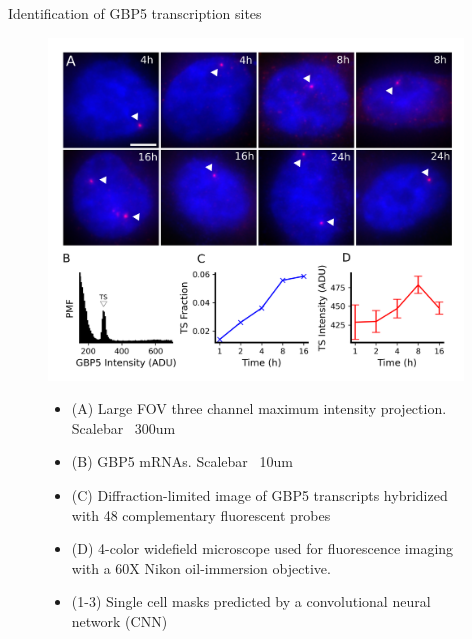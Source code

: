 \documentclass{beamer}					%
\begin{document}
\begin{frame}{Identification of GBP5 transcription sites}
\begin{figure}
\includegraphics[width=11cm]{Figure-2.png}
\begin{itemize}
\item {\fontsize{8pt}{16.8pt}\selectfont (A) Large FOV three channel maximum intensity projection. Scalebar ~300um }
\item {\fontsize{8pt}{16.8pt}\selectfont (B)  GBP5 mRNAs. Scalebar ~10um }
\item {\fontsize{8pt}{16.8pt}\selectfont (C) Diffraction-limited image of GBP5 transcripts hybridized with 48 complementary fluorescent probes }
\item {\fontsize{8pt}{16.8pt}\selectfont (D) 4-color widefield microscope used for fluorescence imaging with a 60X Nikon oil-immersion objective.}
\item {\fontsize{8pt}{16.8pt}\selectfont (1-3) Single cell masks predicted by a convolutional neural network (CNN)}
\end{itemize}
\end{figure}
\end{frame}
\end{document}
